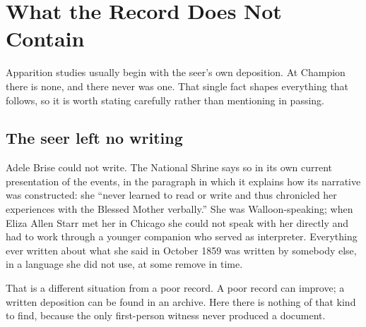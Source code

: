 \section{What the Record Does Not Contain}

Apparition studies usually begin with the seer's own deposition. At
Champion there is none, and there never was one. That single fact
shapes everything that follows, so it is worth stating carefully rather
than mentioning in passing.

\subsection{The seer left no writing}

Adele Brise could not write. The National Shrine says so in its own
current presentation of the events, in the paragraph in which it
explains how its narrative was constructed: she ``never learned to read
or write and thus chronicled her experiences with the Blessed Mother
verbally.'' She was
Walloon-speaking; when Eliza Allen Starr met her in Chicago she could not speak
with her directly and had to work through a younger companion who
served as interpreter. Everything ever written about what she said in October
1859 was written by somebody else, in a language she did not use, at
some remove in time.

That is a different situation from a poor record. A poor record can
improve; a written deposition can be found in an archive. Here there is
nothing of that kind to find, because the only first-person witness
never produced a document.

